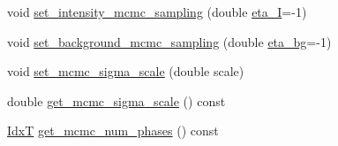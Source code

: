 \begin{DoxyCompactItemize}
\item 
void \hyperlink{classmappel_1_1MCMCAdaptor1D_ac70f768928859b1e9449b0ec1a141c4c}{set\+\_\+intensity\+\_\+mcmc\+\_\+sampling} (double \hyperlink{classmappel_1_1MCMCAdaptor1D_a5780d326be0c40e10d6c91777cfffbd3}{eta\+\_\+I}=-\/1)
\item 
void \hyperlink{classmappel_1_1MCMCAdaptor1D_ae79ee3845fbdd0e378f00eeebf8ccef1}{set\+\_\+background\+\_\+mcmc\+\_\+sampling} (double \hyperlink{classmappel_1_1MCMCAdaptor1D_af54c93421b8e298289cbb92743c6b3d5}{eta\+\_\+bg}=-\/1)
\item 
void \hyperlink{classmappel_1_1MCMCAdaptorBase_aa6b8eea136bf1f34f0c50bf8d1937a58}{set\+\_\+mcmc\+\_\+sigma\+\_\+scale} (double scale)
\item 
double \hyperlink{classmappel_1_1MCMCAdaptorBase_a9de5ee52bbf5c8fd3c1e3bd00836801a}{get\+\_\+mcmc\+\_\+sigma\+\_\+scale} () const 
\item 
\hyperlink{namespacemappel_ab17ec0f30b61ece292439d7ece81d3a8}{IdxT} \hyperlink{classmappel_1_1MCMCAdaptorBase_adb9997f1dc774f3a169c61cdb730a85f}{get\+\_\+mcmc\+\_\+num\+\_\+phases} () const 
\end{DoxyCompactItemize}

